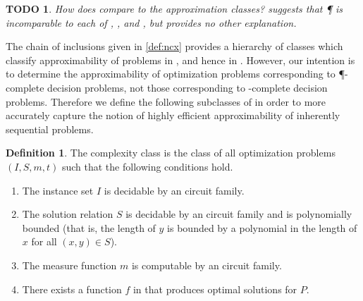 \documentclass[]{article}
\theoremstyle{plain}
\newtheorem{todo}{TODO}
\theoremstyle{definition}
\newtheorem{definition}{Definition}
\begin{document}
\begin{todo}
  How does \PO{} compare to the \NC{} approximation classes?
  \cite[Figure~2.2]{dsst97} suggests that \P{} is incomparable to each of \FNCAS, \NCAS, and \ApxNCO, but provides no other explanation.
\end{todo}

The chain of inclusions given in \autoref{def:ncx} provides a hierarchy of classes which classify approximability of problems in \NNCO{}, and hence in \NPO.
However, our intention is to determine the approximability of optimization problems corresponding to \P-complete decision problems, not those corresponding to \NP-complete decision problems.
Therefore we define the following subclasses of \PO{} in order to more accurately capture the notion of highly efficient approximability of inherently sequential problems.

\begin{definition}\label{def:poprime}
  The complexity class \POp{} is the class of all optimization problems $(I, S, m, t)$ such that the following conditions hold.
  \begin{enumerate}
  \item The instance set $I$ is decidable by an \NC{} circuit family.
  \item The solution relation $S$ is decidable by an \NC{} circuit family and is polynomially bounded (that is, the length of $y$ is bounded by a polynomial in the length of $x$ for all $(x, y)\in S$).
  \item The measure function $m$ is computable by an \FNC{} circuit family.
  \item There exists a function $f$ in \FP{} that produces optimal solutions for $P$.
  \end{enumerate}
\end{definition}
\end{document}
